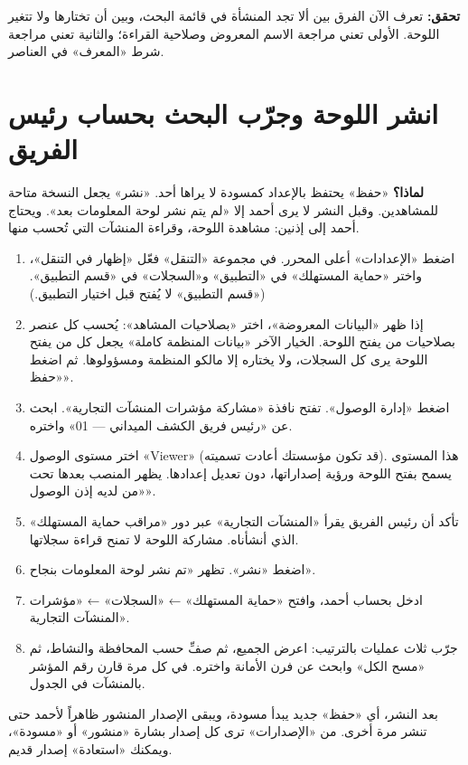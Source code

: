 \textbf{تحقق:} تعرف الآن الفرق بين ألا تجد المنشأة في قائمة البحث، وبين أن تختارها ولا تتغير اللوحة. الأولى تعني مراجعة الاسم المعروض وصلاحية القراءة؛ والثانية تعني مراجعة شرط «المعرف» في العناصر.

\section{انشر اللوحة وجرّب البحث بحساب رئيس الفريق}
\label{sec:build-dashboard-publish}

\textbf{لماذا؟} «حفظ» يحتفظ بالإعداد كمسودة لا يراها أحد. «نشر» يجعل النسخة متاحة للمشاهدين. وقبل النشر لا يرى أحمد إلا «لم يتم نشر لوحة المعلومات بعد». ويحتاج أحمد إلى إذنين: مشاهدة اللوحة، وقراءة المنشآت التي تُحسب منها.

\begin{enumerate}
\item اضغط «الإعدادات» أعلى المحرر. في مجموعة «التنقل» فعّل «إظهار في التنقل»، واختر «حماية المستهلك» في «التطبيق» و«السجلات» في «قسم التطبيق». («قسم التطبيق» لا يُفتح قبل اختيار التطبيق.)
\item إذا ظهر «البيانات المعروضة»، اختر «بصلاحيات المشاهد»: يُحسب كل عنصر بصلاحيات من يفتح اللوحة. الخيار الآخر «بيانات المنظمة كاملة» يجعل كل من يفتح اللوحة يرى كل السجلات، ولا يختاره إلا مالكو المنظمة ومسؤولوها. ثم اضغط «حفظ».
\item اضغط «إدارة الوصول». تفتح نافذة «مشاركة مؤشرات المنشآت التجارية». ابحث عن «رئيس فريق الكشف الميداني — 01» واختره.
\item اختر مستوى الوصول «Viewer» (قد تكون مؤسستك أعادت تسميته). هذا المستوى يسمح بفتح اللوحة ورؤية إصداراتها، دون تعديل إعدادها. يظهر المنصب بعدها تحت «من لديه إذن الوصول».
\item تأكد أن رئيس الفريق يقرأ «المنشآت التجارية» عبر دور «مراقب حماية المستهلك» الذي أنشأناه. مشاركة اللوحة لا تمنح قراءة سجلاتها.
\item اضغط «نشر». تظهر «تم نشر لوحة المعلومات بنجاح».
\item ادخل بحساب أحمد، وافتح «حماية المستهلك» ← «السجلات» ← «مؤشرات المنشآت التجارية».
\item جرّب ثلاث عمليات بالترتيب: اعرض الجميع، ثم صفِّ حسب المحافظة والنشاط، ثم «مسح الكل» وابحث عن فرن الأمانة واختره. في كل مرة قارن رقم المؤشر بالمنشآت في الجدول.
\end{enumerate}

\begin{rcnote}[الإصدارات]
بعد النشر، أي «حفظ» جديد يبدأ مسودة، ويبقى الإصدار المنشور ظاهراً لأحمد حتى تنشر مرة أخرى. من «الإصدارات» ترى كل إصدار بشارة «منشور» أو «مسودة»، ويمكنك «استعادة» إصدار قديم.
\end{rcnote}

